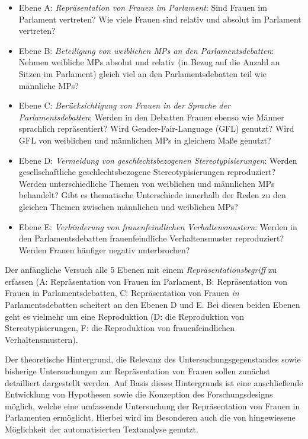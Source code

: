 \documentclass[12pt, 
    twoside=false, 
    bibliography=totoc, 
    numbers=endperiod, 
    headings=normal, 
    toc=chapterentrydotfill
    ]{scrbook}
\begin{document}
\begin{itemize}
    \item Ebene A: \emph{Repräsentation von Frauen im Parlament}: Sind Frauen im Parlament vertreten? Wie viele Frauen sind relativ und absolut im Parlament vertreten? 
    \item Ebene B: \emph{Beteiligung von weiblichen MPs an den Parlamentsdebatten}: Nehmen weibliche MPs absolut und relativ (in Bezug auf die Anzahl an Sitzen im Parlament) gleich viel an den Parlamentsdebatten teil wie männliche MPs? 
    \item Ebene C: \emph{Berücksichtigung von Frauen in der Sprache der Parlamentsdebatten}: Werden in den Debatten Frauen ebenso wie Männer sprachlich repräsentiert? Wird Gender-Fair-Language (GFL) genutzt? Wird GFL von weiblichen und männlichen MPs in gleichem Maße genutzt? 
    \item Ebene D: \emph{Vermeidung von geschlechtsbezogenen Stereotypisierungen}: Werden gesellschaftliche geschlechtsbezogene Stereotypisierungen reproduziert? Werden unterschiedliche Themen von weiblichen und männlichen MPs behandelt? Gibt es thematische Unterschiede innerhalb der Reden zu den gleichen Themen zwischen männlichen und weiblichen MPs? 
    \item Ebene E: \emph{Verhinderung von frauenfeindlichen Verhaltensmustern}: Werden in den Parlamentsdebatten frauenfeindliche Verhaltensmuster reproduziert? Werden Frauen häufiger negativ unterbrochen? 
    \end{itemize}

Der anfängliche Versuch alle 5 Ebenen mit einem \emph{Repräsentationsbegriff} zu erfassen (A: Repräsentation von Frauen im Parlament, B: Repräsentation von Frauen in Parlamentsdebatten, C: Repräsentation von Frauen \emph{in} Parlamentsdebatten scheitert an den Ebenen D und E. Bei diesen beiden Ebenen geht es vielmehr um eine Reproduktion (D: die Reproduktion von Stereotypisierungen, F: die Reproduktion von frauenfeindlichen Verhaltensmustern).

Der theoretische Hintergrund, die Relevanz des Untersuchungsgegenstandes sowie bisherige Untersuchungen zur Repräsentation von Frauen sollen zunächst detailliert dargestellt werden. Auf Basis dieses Hintergrunds ist eine anschließende Entwicklung von Hypothesen sowie die Konzeption des Forschungsdesigns möglich, welche eine umfassende Untersuchung der Repräsentation von Frauen in Parlamenten ermöglicht. Hierbei wird im Besonderen auch die von \textcite[18]{back_2018} hingewiesene Möglichkeit der automatisierten Textanalyse genutzt.
\end{document}
